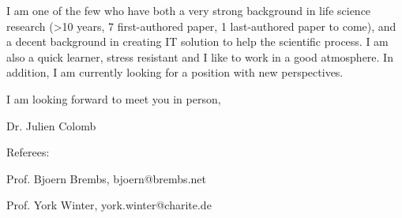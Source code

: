 I am one of the few who have both a very strong background in life science research (>10 years, 7 first-authored paper, 1 last-authored paper to come), and a decent background in creating IT solution to help the scientific process. I am also a quick learner, stress resistant and I like to work in a good atmosphere. In addition, I am currently looking for a position with new perspectives.

I am looking forward to meet you in person,

Dr. Julien Colomb


\vspace {0.5cm} 

Referees:

Prof. Bjoern Brembs, bjoern@brembs.net

Prof. York Winter, york.winter@charite.de
